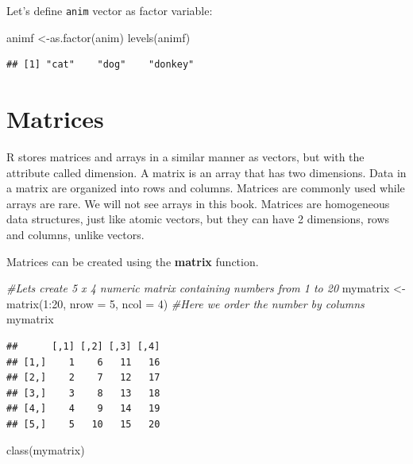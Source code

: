 \documentclass[
]{book}
\newenvironment{Shaded}{\begin{snugshade}}{\end{snugshade}}
\newcommand{\AttributeTok}[1]{\textcolor[rgb]{0.77,0.63,0.00}{#1}}
\newcommand{\CommentTok}[1]{\textcolor[rgb]{0.56,0.35,0.01}{\textit{#1}}}
\newcommand{\DecValTok}[1]{\textcolor[rgb]{0.00,0.00,0.81}{#1}}
\newcommand{\FunctionTok}[1]{\textcolor[rgb]{0.00,0.00,0.00}{#1}}
\newcommand{\NormalTok}[1]{#1}
\newcommand{\OtherTok}[1]{\textcolor[rgb]{0.56,0.35,0.01}{#1}}
\newcommand{\SpecialCharTok}[1]{\textcolor[rgb]{0.00,0.00,0.00}{#1}}
\theoremstyle{definition}
\theoremstyle{definition}
\theoremstyle{definition}
\theoremstyle{definition}
\theoremstyle{remark}
\begin{document}
Let's define \texttt{anim} vector as factor variable:

\begin{Shaded}
\begin{Highlighting}[]
\NormalTok{animf }\OtherTok{\textless{}{-}}\FunctionTok{as.factor}\NormalTok{(anim)}
\FunctionTok{levels}\NormalTok{(animf)}
\end{Highlighting}
\end{Shaded}

\begin{verbatim}
## [1] "cat"    "dog"    "donkey"
\end{verbatim}

\hypertarget{matrices}{%
\chapter{Matrices}\label{matrices}}

R stores matrices and arrays in a similar manner as vectors, but with the attribute called dimension. A matrix is an array that has two dimensions. Data in a matrix are organized into rows and columns. Matrices are commonly used while arrays are rare. We will not see arrays in this book. Matrices are homogeneous data structures, just like atomic vectors, but they can have 2 dimensions, rows and columns, unlike vectors.

Matrices can be created using the \textbf{matrix} function.

\begin{Shaded}
\begin{Highlighting}[]
\CommentTok{\#Let\textquotesingle{}s create 5 x 4 numeric matrix containing numbers from 1 to 20}
\NormalTok{mymatrix }\OtherTok{\textless{}{-}} \FunctionTok{matrix}\NormalTok{(}\DecValTok{1}\SpecialCharTok{:}\DecValTok{20}\NormalTok{, }\AttributeTok{nrow =} \DecValTok{5}\NormalTok{, }\AttributeTok{ncol =} \DecValTok{4}\NormalTok{)  }\CommentTok{\#Here we order the number by columns}
\NormalTok{mymatrix}
\end{Highlighting}
\end{Shaded}

\begin{verbatim}
##      [,1] [,2] [,3] [,4]
## [1,]    1    6   11   16
## [2,]    2    7   12   17
## [3,]    3    8   13   18
## [4,]    4    9   14   19
## [5,]    5   10   15   20
\end{verbatim}

\begin{Shaded}
\begin{Highlighting}[]
\FunctionTok{class}\NormalTok{(mymatrix)}
\end{Highlighting}
\end{Shaded}
\end{document}
